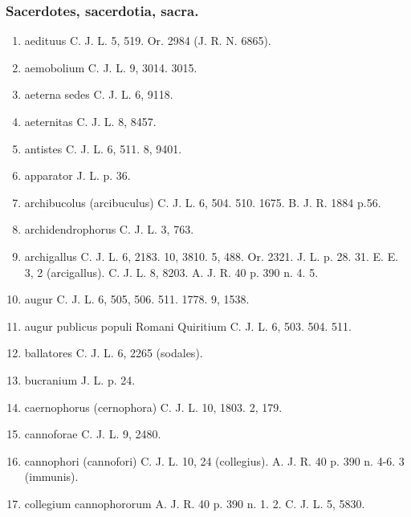 \documentclass[a4paper, 11pt, oneside, polutonikogreek, german]{article}
\begin{document}
\subsubsection{Sacerdotes, sacerdotia, sacra.}
\begin{enumerate}
\item aedituus C. J. L. 5, 519. Or. 2984 (J. R. N. 6865).

\item aemobolium C. J. L. 9, 3014. 3015.

\item aeterna sedes C. J. L. 6, 9118.

\item aeternitas C. J. L. 8, 8457.

\item antistes C. J. L. 6, 511. 8, 9401.

\item apparator J. L. p. 36.

\item archibucolus (arcibuculus) C. J. L. 6, 504. 510. 1675. B. J. R. 1884 p.56.

\item archidendrophorus C. J. L. 3, 763.

\item archigallus C. J. L. 6, 2183. 10, 3810. 5, 488. Or. 2321. J. L. p. 28. 31. E. E. 3, 2 (arcigallus). C. J. L. 8, 8203. A. J. R. 40 p. 390 n. 4. 5.

\item augur C. J. L. 6, 505, 506. 511. 1778. 9, 1538.

\item augur publicus populi Romani Quiritium C. J. L. 6, 503. 504. 511.

\item ballatores C. J. L. 6, 2265 (sodales).

\item bucranium J. L. p. 24.

\item caernophorus (cernophora) C. J. L. 10, 1803. 2, 179.

\item cannoforae C. J. L. 9, 2480.

\item cannophori (cannofori) C. J. L. 10, 24 (collegius). A. J. R. 40 p. 390 n. 4-6. 3 (immunis).

\item collegium cannophororum A. J. R. 40 p. 390 n. 1. 2. C. J. L. 5, 5830.


\end{enumerate}
\end{document}
